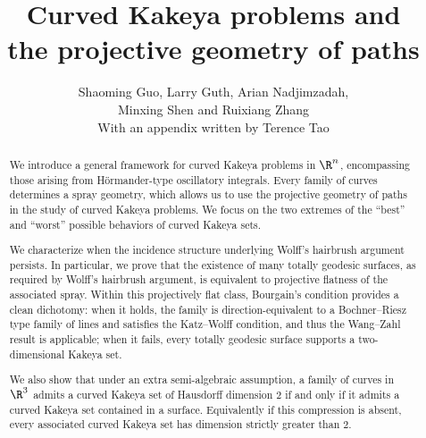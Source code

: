 \documentclass{article}
\title{Curved Kakeya problems and \\the projective geometry of paths}
\date{}
\author{Shaoming Guo, Larry Guth, Arian Nadjimzadah,\\
Minxing Shen and Ruixiang Zhang\\[1em]
\normalsize With an appendix written by Terence Tao}
\numberwithin{equation}{section}
\theoremstyle{plain}
\begin{document}
\maketitle 







\begin{abstract}
    We introduce a general framework for curved Kakeya problems in $\R^n$, encompassing those arising from H\"ormander-type oscillatory integrals. Every family of curves determines a spray geometry, which allows us to use the projective geometry of paths in the study of curved Kakeya problems. We focus on the two extremes of the ``best'' and ``worst'' possible behaviors of curved Kakeya sets. 

    We characterize when the incidence structure underlying Wolff's hairbrush argument persists. In particular,  
    we prove that the existence of many totally geodesic surfaces, as required by Wolff's hairbrush argument, is equivalent to projective flatness of the associated spray.  Within this projectively flat class, Bourgain’s condition provides a clean dichotomy: when it holds, the family is direction-equivalent to a Bochner–Riesz type family of lines and satisfies the Katz–Wolff condition, and thus the Wang--Zahl result is applicable; when it fails, every totally geodesic surface supports a two-dimensional Kakeya set. 


    We also show that under an extra semi-algebraic assumption, a family of curves in $\R^3$ admits a curved Kakeya set of Hausdorff dimension $2$ if and only if it admits a curved Kakeya set contained in a surface. Equivalently if this compression is absent, every associated curved Kakeya set has dimension strictly greater than $2$. 
    



    
    

    
    
    

\end{abstract}
\end{document}
